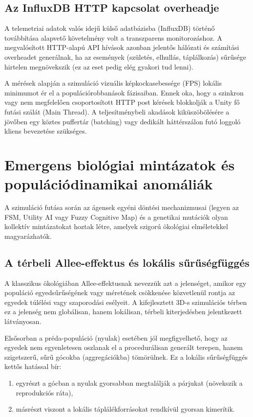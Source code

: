 \subsection{Az InfluxDB HTTP kapcsolat overheadje}
A telemetriai adatok valós idejű külső adatbázisba (InfluxDB) történő továbbítása alapvető követelmény volt a transzparens monitorozáshoz. A megvalósított HTTP-alapú API hívások azonban jelentős hálózati és számítási overheadet generálnak, ha az események (születés, elhullás, táplálkozás) sűrűsége hirtelen megnövekszik (ez az eset pedig elég gyakori tud lenni). 

A mérések alapján a szimuláció vizuális képkockasebessége (FPS) lokális minimumot ér el a populációrobbanások fázisaiban. Ennek oka, hogy a szinkron vagy nem megfelelően csoportosított HTTP post kérések blokkolják a Unity fő futási szálát (Main Thread). A teljesítménybeli akadások kiküszöbölésére a jövőben egy köztes puffertár (batching) vagy dedikált háttérszálon futó loggoló kliens bevezetése szükséges.

\section{Emergens biológiai mintázatok és populációdinamikai anomáliák}

A szimuláció futása során az ágensek egyéni döntési mechanizmusai (legyen az FSM, Utility AI vagy Fuzzy Cognitive Map) és a genetikai mutációk olyan kollektív mintázatokat hoztak létre, amelyek szigorú ökológiai elméletekkel magyarázhatók.

\subsection{A térbeli Allee-effektus és lokális sűrűségfüggés}
A klasszikus ökológiában Allee-effektusnak nevezzük azt a jelenséget, amikor egy populáció egyedsűrűségének vagy méretének csökkenése közvetlenül rontja az egyedek túlélési vagy szaporodási esélyeit. A kifejlesztett 3D-s szimulációs térben ez a jelenség nem globálisan, hanem lokálisan, térbeli kiterjedésben jelentkezett látványosan.

Elsősorban a préda-populáció (nyulak) esetében jól megfigyelhető, hogy az egyedek nem egyenletesen oszlanak el a procedurálisan generált terepen, hanem szigetszerű, sűrű gócokba (aggregációkba) tömörülnek. Ez a lokális sűrűségfüggés kettős hatással bír:
\begin{enumerate}
  \item egyrészt a gócban a nyulak gyorsabban megtalálják a párjukat (növekszik a reprodukciós ráta),
  \item másrészt viszont a lokális táplálékforrásokat rendkívül gyorsan kimerítik.
\end{enumerate}

